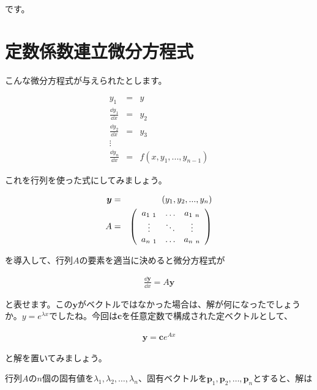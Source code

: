\noindent
です。










\section{定数係数連立微分方程式}
\label{multiple}
こんな微分方程式が与えられたとします。

\begin{eqnarray}
y_1&=&y \nonumber \\
\frac{\dd y_1}{\dd x}&=&y_2 \nonumber \\
\frac{\dd y_2}{\dd x}&=&y_3 \nonumber \\
\vdots \nonumber\\
\frac{\dd y_n}{\dd x}&=&f(x,y_1,...,y_{n-1})
\end{eqnarray}

これを行列を使った式にしてみましょう。

\begin{eqnarray}
    \boldsymbol{y}&=&(y_1,y_2,...,y_n) \\
    A&=&\pqty{\begin{array}{ccc}
        a_{1\ 1} & \hdots & a_{1\ n} \\
        \vdots & \ddots & \vdots \\
        a_{n\ 1} & \hdots & a_{n\ n}
    \end{array}}
\end{eqnarray}

\noindent
を導入して、行列$A$の要素を適当に決めると微分方程式が

\begin{eqnarray}
    \frac{\dd \boldsymbol{y}}{\dd x}=A\boldsymbol{y}
    \label{eq:multiple-y}
\end{eqnarray}

\noindent
と表せます。この$\boldsymbol{y}$がベクトルではなかった場合は、解が何になったでしょうか。$y=e^{\lambda x}$でしたね。今回は$\boldsymbol{c}$を任意定数で構成された定ベクトルとして、

\begin{eqnarray}
    \boldsymbol{y}=\boldsymbol{c}e^{A x}
\end{eqnarray}

\noindent
と解を置いてみましょう。

行列$A$の$n$個の固有値を$\lambda_1,\lambda_2,\dots,\lambda_n$、固有ベクトルを$\boldsymbol{p}_1,\boldsymbol{p}_2,\dots,\boldsymbol{p}_n$とすると、解は

